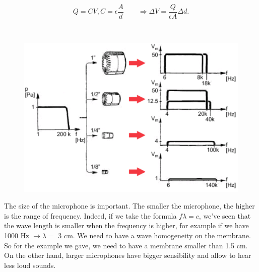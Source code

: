 	\begin{equation}
	Q = CV, C = \epsilon \frac{A}{d} \qquad \Rightarrow \Delta V = \frac{Q}{\epsilon A} \Delta d.
	\end{equation}
	
	\ \\
	
	\begin{figure}
	\vspace{-5mm}
	\includegraphics[scale=0.25]{acoustics/ch3/2}
	\label{fig:3.2}
	\end{figure}
	The size of the microphone is important. The smaller the microphone, the higher is the range of frequency. Indeed, if we take the formula $f \lambda = c$, we've seen that the wave length is smaller when the frequency is higher, for example if we have 1000 Hz $\rightarrow \lambda =$ 3 cm. We need to have a wave homogeneity on the membrane. So for the example we gave, we need to have a membrane smaller than 1.5 cm. On the other hand, larger microphones have bigger sensibility and allow to hear less loud sounds. 
	
